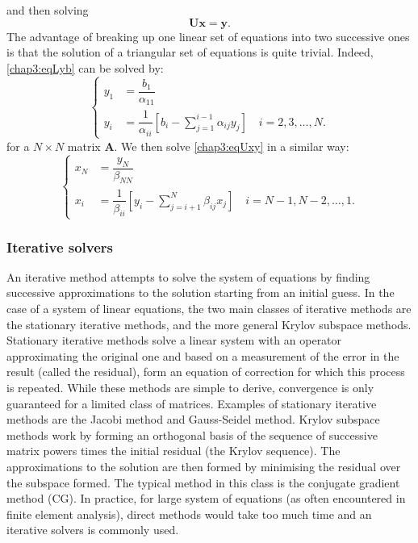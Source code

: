 and then solving 
\begin{equation}
\label{chap3:eqUxy}
\mathbf{U} \mathbf{x} = \mathbf{y}.
\end{equation}
The advantage of breaking up one linear set of equations into two successive ones is that the solution of a triangular set of equations is quite trivial. Indeed, \eqref{chap3:eqLyb} can be solved by:
\begin{equation} 
\left\lbrace
	\begin{aligned}
		y_1 &= \dfrac{b_1}{\alpha_{11}}  \\	
		y_i &= \dfrac{1}{\alpha_{ii}} \left[ b_i - \sum_{j=1}^{i-1} \alpha_{ij} y_j \right] \quad i = 2, 3, \ldots, N.
	\end{aligned} 
\right.
\end{equation}
for a $ N \times N $ matrix $ \mathbf{A} $. We then solve \eqref{chap3:eqUxy} in a similar way:
\begin{equation} 
\left\lbrace
	\begin{aligned}
		x_N &= \dfrac{y_N}{\beta_{NN}} \\	
		x_i &= \dfrac{1}{\beta_{ii}} \left[ y_i - \sum_{j=i+1}^{N} \beta_{ij} x_j \right] \quad i = N-1, N-2, \ldots, 1. 
	\end{aligned} 
\right.
\end{equation}

\paragraph*{}


		\subsubsection*{Iterative solvers}
An iterative method attempts to solve the system of equations by finding successive approximations to the solution starting from an initial guess. In the case of a system of linear equations, the two main classes of iterative methods are the stationary iterative methods, and the more general Krylov subspace methods. Stationary iterative methods solve a linear system with an operator approximating the original one and based on a measurement of the error in the result (called the residual), form an equation of correction for which this process is repeated. While these methods are simple to derive, convergence is only guaranteed for a limited class of matrices. Examples of stationary iterative methods are the Jacobi method and Gauss-Seidel method. Krylov subspace methods work by forming an orthogonal basis of the sequence of successive matrix powers times the initial residual (the Krylov sequence). The approximations to the solution are then formed by minimising the residual over the subspace formed. The typical method in this class is the conjugate gradient method (CG). 
In practice, for large system of equations (as often encountered in finite element analysis), direct methods would take too much time and an iterative solvers is commonly used. 

